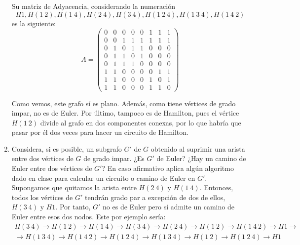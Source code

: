 \begin{ejercicio}
\begin{enumerate}
        Su matriz de Adyacencia, considerando la numeración
        $$H1, H(1\ 2), H(1\ 4), H(2\ 4), H(3\ 4), H(1\ 2\ 4), H(1\ 3\ 4), H(1\ 4\ 2)$$ es la siguiente:
        \[
            A=\begin{pmatrix}
                0 & 0 & 0 & 0 & 0 & 1 & 1 & 1 \\
                0 & 0 & 1 & 1 & 1 & 1 & 1 & 1 \\
                0 & 1 & 0 & 1 & 1 & 0 & 0 & 0 \\
                0 & 1 & 1 & 0 & 1 & 0 & 0 & 0 \\
                0 & 1 & 1 & 1 & 0 & 0 & 0 & 0 \\
                1 & 1 & 0 & 0 & 0 & 0 & 1 & 1 \\
                1 & 1 & 0 & 0 & 0 & 1 & 0 & 1 \\
                1 & 1 & 0 & 0 & 0 & 1 & 1 & 0
            \end{pmatrix}
        \]

        Como vemos, este grafo sí es plano. Además, como tiene vértices de grado impar, no es de Euler. Por último, tampoco es de Hamilton, pues el vértice $H(1\ 2)$ divide al grafo en dos componentes conexas, por lo que habría que pasar por él dos veces para hacer un circuito de Hamilton.
        \item Considera, si es posible, un subgrafo $G'$ de $G$ obtenido al suprimir una arista entre dos vértices de $G$ de grado impar. ¿Es $G'$ de Euler? ¿Hay un camino de Euler entre dos vértices de $G'$? En caso afirmativo aplica algún algoritmo dado en clase para calcular un circuito o camino de Euler en $G'$.\\
        
        Supongamos que quitamos la arista entre $H(2\ 4)$ y $H(1\ 4)$. Entonces, todos los vértices de $G'$ tendrán grado par a excepción de dos de ellos, $H(3\ 4)$ y $H1$. Por tanto, $G'$ no es de Euler pero sí admite un camino de Euler entre esos dos nodos. Este por ejemplo sería:
        \begin{multline*}
            H(3\ 4)\to H(1\ 2)\to H(1\ 4)\to H(3\ 4)\to H(2\ 4)\to H(1\ 2)\to H(1\ 4\ 2)\to H1\to \\\to H(1\ 3\ 4)\to H(1\ 4\ 2)\to H(1\ 2\ 4)\to H(1\ 3\ 4)\to H(1\ 2)\to H(1\ 2\ 4)\to H1
        \end{multline*}
    \end{enumerate}
\end{ejercicio}

